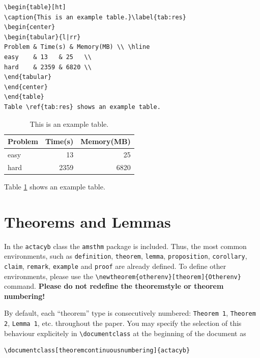 \documentclass[withtitlethanks]{actacyb}
\begin{document}
\begin{verbatim}
\begin{table}[ht]
\caption{This is an example table.}\label{tab:res}
\begin{center}
\begin{tabular}{l|rr}
Problem & Time(s) & Memory(MB) \\ \hline
easy    & 13   & 25   \\
hard    & 2359 & 6820 \\
\end{tabular}
\end{center}
\end{table}
Table \ref{tab:res} shows an example table.
\end{verbatim}

\begin{table}[ht]
\caption{This is an example table.}\label{tab:res}
\begin{center}
\begin{tabular}{l|rr}
Problem & Time(s) & Memory(MB) \\ \hline
easy    & 13   & 25   \\
hard    & 2359 & 6820 \\
\end{tabular}
\end{center}
\end{table}
Table \ref{tab:res} shows an example table.


\section{Theorems and Lemmas}

In the \verb|actacyb| class the \verb|amsthm| package is included.
Thus, the most common environments, such as \verb|definition|, \verb|theorem|, \verb|lemma|,
\verb|proposition|, \verb|corollary|, \verb|claim|, \verb|remark|, \verb|example| and \verb|proof| are already defined.
To define other environments, please use the \verb|\newtheorem{otherenv}[theorem]{Otherenv}|  
command.
{\bf Please do not redefine the theoremstyle or theorem numbering!}

By default, each ``theorem'' type is consecutively numbered:
\texttt{Theorem 1}, \texttt{Theorem 2}, \texttt{Lemma 1}, etc. throughout the paper.
You may specify the selection of this behaviour explicitely in \verb|\documentclass| at the beginning of the document as

\begin{verbatim}
\documentclass[theoremcontinuousnumbering]{actacyb}
\end{verbatim}
\end{document}
